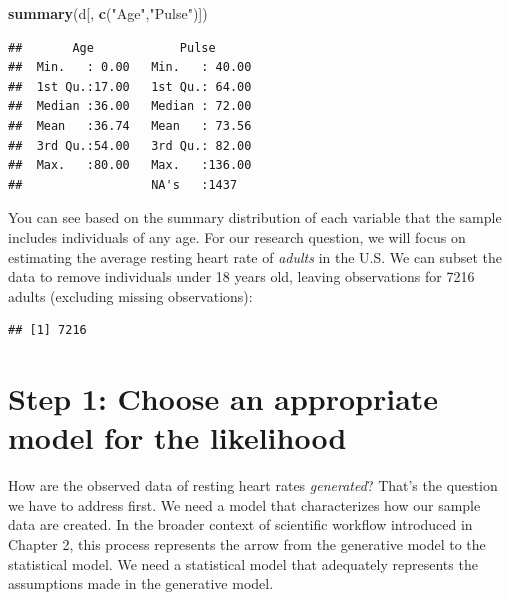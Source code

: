 \documentclass[
]{book}
\newenvironment{Shaded}{\begin{snugshade}}{\end{snugshade}}
\newcommand{\CommentTok}[1]{\textcolor[rgb]{0.56,0.35,0.01}{\textit{#1}}}
\newcommand{\DecValTok}[1]{\textcolor[rgb]{0.00,0.00,0.81}{#1}}
\newcommand{\FunctionTok}[1]{\textcolor[rgb]{0.13,0.29,0.53}{\textbf{#1}}}
\newcommand{\NormalTok}[1]{#1}
\newcommand{\OtherTok}[1]{\textcolor[rgb]{0.56,0.35,0.01}{#1}}
\newcommand{\SpecialCharTok}[1]{\textcolor[rgb]{0.81,0.36,0.00}{\textbf{#1}}}
\newcommand{\StringTok}[1]{\textcolor[rgb]{0.31,0.60,0.02}{#1}}
\begin{document}
\begin{Shaded}
\begin{Highlighting}[]
\FunctionTok{summary}\NormalTok{(d[, }\FunctionTok{c}\NormalTok{(}\StringTok{"Age"}\NormalTok{,}\StringTok{"Pulse"}\NormalTok{)])}
\end{Highlighting}
\end{Shaded}

\begin{verbatim}
##       Age            Pulse       
##  Min.   : 0.00   Min.   : 40.00  
##  1st Qu.:17.00   1st Qu.: 64.00  
##  Median :36.00   Median : 72.00  
##  Mean   :36.74   Mean   : 73.56  
##  3rd Qu.:54.00   3rd Qu.: 82.00  
##  Max.   :80.00   Max.   :136.00  
##                  NA's   :1437
\end{verbatim}

You can see based on the summary distribution of each variable that the
sample includes individuals of any age. For our research question, we
will focus on estimating the average resting heart rate of \emph{adults} in
the U.S. We can subset the data to remove individuals under 18 years
old, leaving observations for 7216 adults (excluding missing observations):

\begin{Shaded}
\end{Shaded}

\begin{verbatim}
## [1] 7216
\end{verbatim}

\section{Step 1: Choose an appropriate model for the likelihood}\label{step-1-choose-an-appropriate-model-for-the-likelihood}

How are the observed data of resting heart rates \emph{generated}? That's the question we have to address first. We need a model that characterizes how our sample data are created. In the broader context of scientific workflow introduced in Chapter 2, this process represents the arrow from the generative model to the statistical model. We need a statistical model that adequately represents the assumptions made in the generative model.
\end{document}
